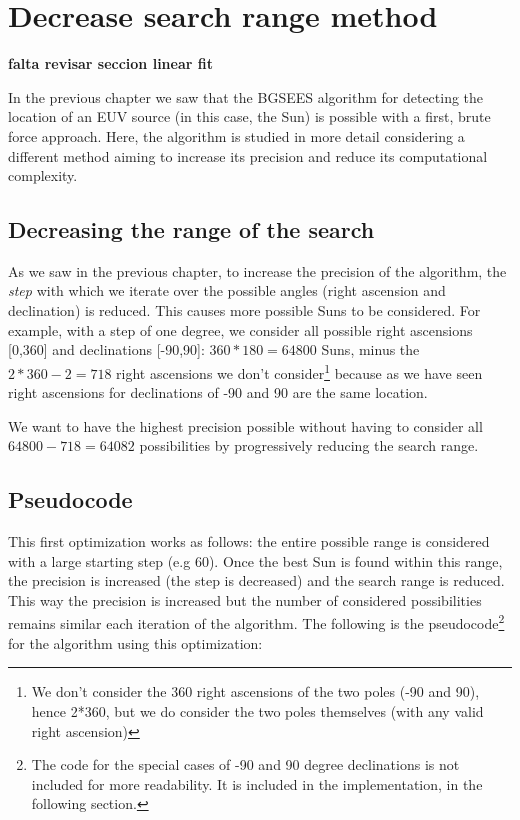 \chapter{Decrease search range method}

\textbf{falta revisar seccion linear fit}

In the previous chapter we saw that the BGSEES algorithm for detecting the location of an EUV source (in this case, the Sun) is possible with a first, brute force approach. Here, the algorithm is studied in more detail considering a different method aiming to increase its precision and reduce its computational complexity.

\section{Decreasing the range of the search}

As we saw in the previous chapter, to increase the precision of the algorithm, the \textit{step} with which we iterate over the possible angles (right ascension and declination) is reduced. This causes more possible Suns to be considered. For example, with a step of one degree, we consider all possible right ascensions [0,360] and declinations [-90,90]: $360*180 = 64800$ Suns, minus the $2*360 - 2 = 718$ right ascensions we don't consider\footnote{We don't consider the 360 right ascensions of the two poles (-90 and 90), hence 2*360, but we do consider the two poles themselves (with any valid right ascension)} because as we have seen right ascensions for declinations of -90 and 90 are the same location.

We want to have the highest precision possible without having to consider all $64800 - 718 = 64082$ possibilities by progressively reducing the search range.

\section{Pseudocode}

This first optimization works as follows: the entire possible range is considered with a large starting step (e.g 60). Once the best Sun is found within this range, the precision is increased (the step is decreased) and the search range is reduced. This way the precision is increased but the number of considered possibilities remains similar each iteration of the algorithm. The following is the pseudocode\footnote{The code for the special cases of -90 and 90 degree declinations is not included for more readability. It is included in the implementation, in the following section.} for the algorithm using this optimization:

